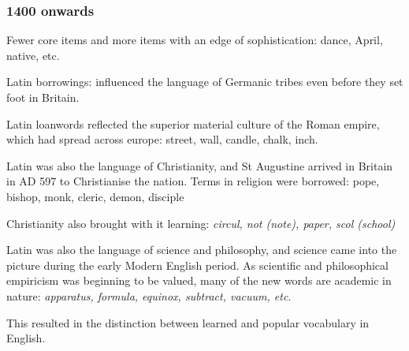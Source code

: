 \documentclass[../main.tex]{subfiles}
\begin{document}
	\subsubsection{1400 onwards}
	Fewer core items and more items with an edge of sophistication: dance, April, native, etc. \par \par
	Latin borrowings: influenced the language of Germanic tribes even before they set foot in Britain.  \par
	Latin loanwords reflected the superior material culture of the Roman empire, which had spread across europe: street, wall, candle, chalk, inch. \par
	Latin was also the language of Christianity, and St Augustine arrived in Britain in AD 597 to Christianise the nation. Terms in religion were borrowed: pope, bishop, monk, cleric, demon, disciple \par
	Christianity also brought with it learning: \textit{circul, not (note), paper, scol (school)} \par
	Latin was also the language of science and philosophy, and science came into the picture during the early Modern English period. As scientific and philosophical empiricism was beginning to be valued, many of the new words are academic in nature: \textit{apparatus, formula, equinox, subtract, vacuum, etc.} \par
	This resulted in the distinction between learned and popular vocabulary in English. \par
\end{document}
